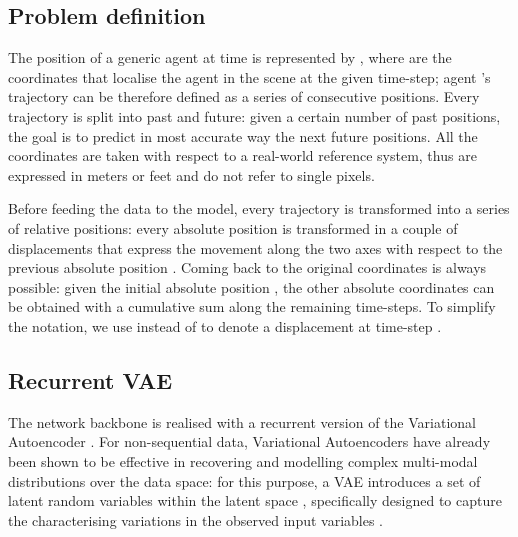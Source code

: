 \documentclass[10pt,a4paper,conference]{IEEEtran}
\begin{document}
\subsection{Problem definition}
The position of a generic agent  at time  is represented by , where  are the coordinates that localise the agent in the scene at the given time-step; agent 's trajectory can be therefore defined as a series  of consecutive positions. Every trajectory  is split into past and future: given a certain number  of past positions, the goal is to predict in most accurate way the next  future positions. All the coordinates are taken with respect to a real-world reference system, thus are expressed in meters or feet and do not refer to single pixels.

Before feeding the data to the model, every trajectory is transformed into a series of relative positions: every absolute position  is transformed in a couple of displacements  that express the movement along the two axes with respect to the previous absolute position . Coming back to the original coordinates is always possible: given the initial absolute position , the other absolute coordinates can be obtained with a cumulative sum along the remaining time-steps. To simplify the notation, we use  instead of  to denote a displacement at time-step .

\subsection{Recurrent VAE}
The network backbone is realised with a recurrent version of the Variational Autoencoder \cite{deep_gen_models}. For non-sequential data, Variational Autoencoders have already been shown to be effective in recovering and modelling complex multi-modal distributions over the data space: for this purpose, a VAE introduces a set of latent random variables  within the latent space , specifically designed to capture the characterising variations in the observed input variables .  
\end{document}
